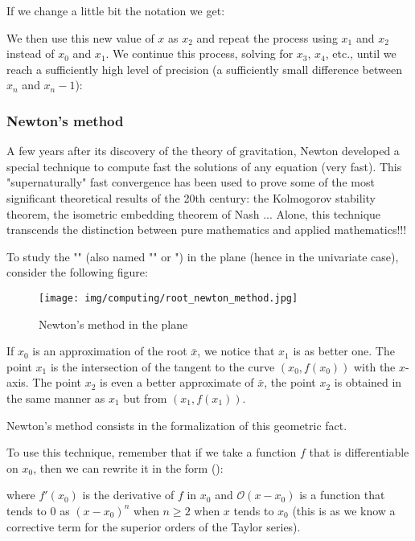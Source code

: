 	If we change a little bit the notation we get:
	
	We then use this new value of $x$ as $x_2$ and repeat the process using $x_1$ and $x_2$ instead of $x_0$ and $x_1$. We continue this process, solving for $x_3$, $x_4$, etc., until we reach a sufficiently high level of precision (a sufficiently small difference between $x_n$ and $x_n - 1$):
	
	
	\pagebreak
	\subsubsection{Newton's method}
	A few years after its discovery of the theory of gravitation, Newton developed a special technique to compute fast the solutions of any equation (very fast). This "supernaturally" fast convergence has been used to prove some of the most significant theoretical results of the 20th century: the Kolmogorov stability theorem, the isometric embedding theorem of Nash ... Alone, this technique transcends the distinction between pure mathematics and applied mathematics!!!
	
	To study the "" (also named "" or ") in the plane (hence in the univariate case), consider the following figure:
	\begin{figure}[H]
		\centering
		\texttt{[image: img/computing/root\_newton\_method.jpg]}
		\caption{Newton's method in the plane}
	\end{figure}
	If $x_0$ is an approximation of the root $\bar{x}$, we notice that $x_1$ is as better one. The point $x_1$ is the intersection of the tangent to the curve $(x_0,f(x_0))$ with the $x$-axis. The point $x_2$ is even a better approximate of $\bar{x}$, the point $x_2$ is obtained in the same manner as $x_1$ but from $(x_1,f(x_1))$.
	
	Newton's method consists in the formalization of this geometric fact.
	
	To use this technique, remember that if we take a function $f$ that is differentiable on $x_0$, then we can rewrite it in the form ():
	
	where $f'(x_0)$ is the derivative of $f$ in $x_0$ and $\mathcal{O}(x-x_0)$ is a function that tends to $0$ as $(x-x_0)^n$ when $n \geq 2$ when $x$ tends to $x_0$ (this is as we know a corrective term for the superior orders of the Taylor series).
	
